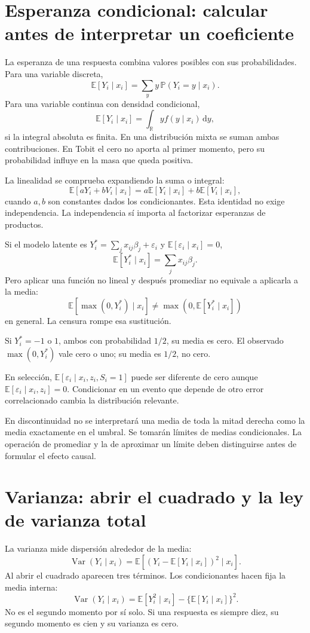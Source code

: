 \documentclass[11pt,a4paper]{article}
\newcommand{\E}{\mathbb E}
\newcommand{\Prob}{\mathbb P}
\newcommand{\dd}{\,\mathrm d}
\DeclareMathOperator{\Var}{Var}
\begin{document}
\clearpage
\section{Esperanza condicional: calcular antes de interpretar un coeficiente}\label{unidad3}
La esperanza de una respuesta combina valores posibles
con sus probabilidades. Para una variable discreta,
\[
\E[Y_i\mid x_i]=\sum_y y\,\Prob(Y_i=y\mid x_i).
\]
Para una variable continua con densidad condicional,
\[
\E[Y_i\mid x_i]=\int_{\mathbb R} y f(y\mid x_i)\dd y,
\]
si la integral absoluta es finita.
En una distribución mixta se suman ambas contribuciones.
En Tobit el cero no aporta al primer momento,
pero su probabilidad influye en la masa que queda positiva.

La linealidad se comprueba expandiendo la suma o integral:
\[
\E[aY_i+bV_i\mid x_i]
=a\E[Y_i\mid x_i]+b\E[V_i\mid x_i],
\]
cuando \(a,b\) son constantes dados los condicionantes.
Esta identidad no exige independencia.
La independencia sí importa al factorizar
esperanzas de productos.

Si el modelo latente es
\(Y_i^\ast=\sum_jx_{ij}\beta_j+\varepsilon_i\)
y \(\E[\varepsilon_i\mid x_i]=0\),
\[
\E[Y_i^\ast\mid x_i]=\sum_jx_{ij}\beta_j.
\]
Pero aplicar una función no lineal y después promediar
no equivale a aplicarla a la media:
\[
\E[\max(0,Y_i^\ast)\mid x_i]
\ne\max(0,\E[Y_i^\ast\mid x_i])
\]
en general.
La censura rompe esa sustitución.

\begin{ejemplo}
Si \(Y_i^\ast=-1\) o \(1\), ambos con probabilidad \(1/2\),
su media es cero.
El observado \(\max(0,Y_i^\ast)\) vale cero o uno;
su media es \(1/2\), no cero.
\end{ejemplo}
En selección, \(\E[\varepsilon_i\mid x_i,z_i,S_i=1]\)
puede ser diferente de cero aunque
\(\E[\varepsilon_i\mid x_i,z_i]=0\).
Condicionar en un evento que depende de otro error
correlacionado cambia la distribución relevante.

En discontinuidad no se interpretará una media
de toda la mitad derecha como la media exactamente
en el umbral. Se tomarán límites de medias condicionales.
La operación de promediar y la de aproximar un límite
deben distinguirse antes de formular el efecto causal.

\clearpage
\section{Varianza: abrir el cuadrado y la ley de varianza total}\label{unidad4}
La varianza mide dispersión alrededor de la media:
\[
\Var(Y_i\mid x_i)
=\E[(Y_i-\E[Y_i\mid x_i])^2\mid x_i].
\]
Al abrir el cuadrado aparecen tres términos.
Los condicionantes hacen fija la media interna:
\[
\Var(Y_i\mid x_i)
=\E[Y_i^2\mid x_i]-\{\E[Y_i\mid x_i]\}^2.
\]
No es el segundo momento por sí solo.
Si una respuesta es siempre diez, su segundo momento
es cien y su varianza es cero.
\end{document}
